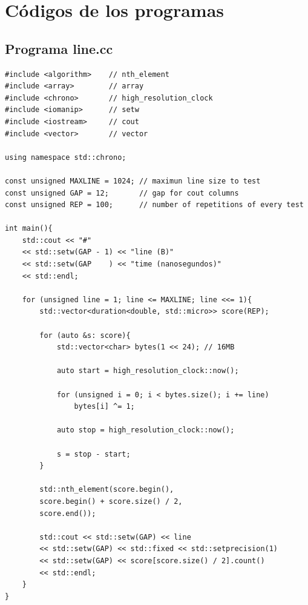 	\tableofcontents %
	
	\listoffigures %
	
	\listoftables %
	
	\newpage
	
	\section[Códigos de los programas]{Códigos de los programas}
	
	\subsection{Programa line.cc}
	
	\lstset{language=C}
	\begin{lstlisting}[frame=single]
#include <algorithm>    // nth_element
#include <array>        // array
#include <chrono>       // high_resolution_clock
#include <iomanip>      // setw
#include <iostream>     // cout
#include <vector>       // vector

using namespace std::chrono;

const unsigned MAXLINE = 1024; // maximun line size to test
const unsigned GAP = 12;       // gap for cout columns
const unsigned REP = 100;      // number of repetitions of every test

int main(){
	std::cout << "#" 
	<< std::setw(GAP - 1) << "line (B)"
	<< std::setw(GAP    ) << "time (nanosegundos)"
	<< std::endl;

	for (unsigned line = 1; line <= MAXLINE; line <<= 1){
		std::vector<duration<double, std::micro>> score(REP);
	
		for (auto &s: score){
			std::vector<char> bytes(1 << 24); // 16MB
	
			auto start = high_resolution_clock::now();
	
			for (unsigned i = 0; i < bytes.size(); i += line)
				bytes[i] ^= 1;
	
			auto stop = high_resolution_clock::now();
	
			s = stop - start;
		}

		std::nth_element(score.begin(), 
		score.begin() + score.size() / 2, 
		score.end());

		std::cout << std::setw(GAP) << line
		<< std::setw(GAP) << std::fixed << std::setprecision(1)
		<< std::setw(GAP) << score[score.size() / 2].count()
		<< std::endl;
	}
}
	\end{lstlisting}
	
